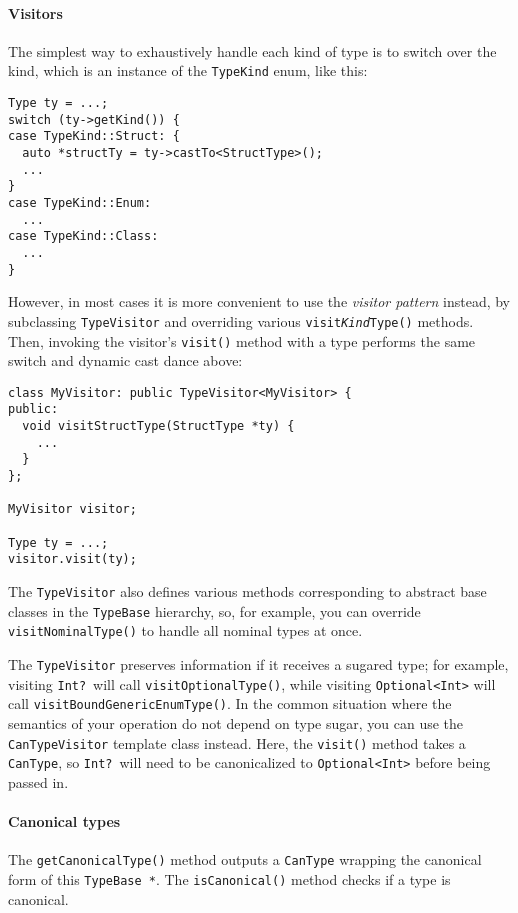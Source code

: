 \documentclass[../generics]{subfiles}
\begin{document}
\paragraph{Visitors}
The simplest way to exhaustively handle each kind of type is to switch over the kind, which is an instance of the \texttt{TypeKind} enum, like this:
\begin{Verbatim}
Type ty = ...;
switch (ty->getKind()) {
case TypeKind::Struct: {
  auto *structTy = ty->castTo<StructType>();
  ...
}
case TypeKind::Enum:
  ...
case TypeKind::Class:
  ...
}
\end{Verbatim}
However, in most cases it is more convenient to use the \emph{visitor pattern} instead, by subclassing \texttt{TypeVisitor} and overriding various \texttt{visit\emph{Kind}Type()} methods. Then, invoking the visitor's \texttt{visit()} method with a type performs the same switch and dynamic cast dance above:
\begin{Verbatim}
class MyVisitor: public TypeVisitor<MyVisitor> {
public:
  void visitStructType(StructType *ty) {
    ...
  }
};

MyVisitor visitor;

Type ty = ...;
visitor.visit(ty);
\end{Verbatim}
The \texttt{TypeVisitor} also defines various methods corresponding to abstract base classes in the \texttt{TypeBase} hierarchy, so, for example, you can override \texttt{visitNominalType()} to handle all nominal types at once.

The \texttt{TypeVisitor} preserves information if it receives a sugared type; for example, visiting \texttt{Int?}\ will call \texttt{visitOptionalType()}, while visiting \texttt{Optional<Int>} will call \texttt{visitBoundGenericEnumType()}. In the common situation where the semantics of your operation do not depend on type sugar, you can use the \texttt{CanTypeVisitor} template class instead. Here, the \texttt{visit()} method takes a \texttt{CanType}, so \texttt{Int?}\ will need to be canonicalized to \texttt{Optional<Int>} before being passed in.

\paragraph{Canonical types}
The \texttt{getCanonicalType()} method outputs a \texttt{CanType} wrapping the canonical form of this \texttt{TypeBase *}. The \texttt{isCanonical()} method checks if a type is canonical.
\end{document}
